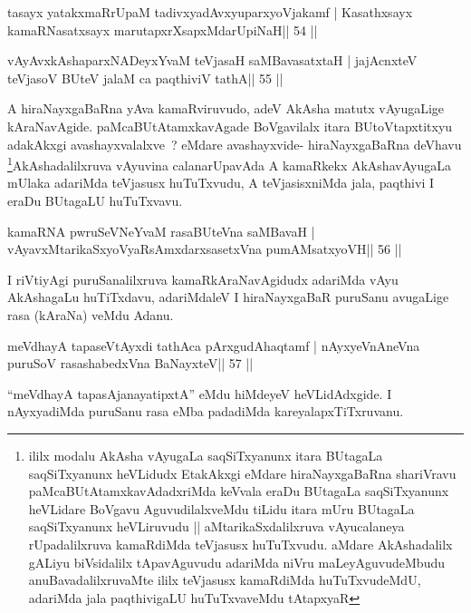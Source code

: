 \begin{shl}
tasayx yatakxmaRrUpaM tadivxyadAvxyuparxyoVjakamf |
Kasathxsayx kamaRNasatxsayx marutapxrXsapxMdarUpiNaH\hfill || 54 ||
\end{shl}

\begin{shl}
vAyAvxkAshaparxNADeyxYvaM teVjasaH saMBavasatxtaH |
jajAcnxteV teVjasoV BUteV jalaM ca paqthiviV tathA\hfill || 55 ||
\end{shl}

\begin{artha}
A hiraNayxgaBaRna yAva kamaRviruvudo, adeV AkAsha matutx vAyugaLige
kAraNavAgide. paMcaBUtAtamxkavAgade BoVgavilalx itara BUtoVtapxtitxyu
adakAkxgi avashayxvalalxve~? eMdare avashayxvide- hiraNayxgaBaRna
deVhavu \footnote{ililx modalu AkAsha vAyugaLa saqSiTxyanunx itara
BUtagaLa saqSiTxyanunx heVLidudx EtakAkxgi eMdare hiraNayxgaBaRna
shariVravu paMcaBUtAtamxkavAdadxriMda keVvala eraDu BUtagaLa
saqSiTxyanunx heVLidare BoVgavu AguvudilalxveMdu tiLidu itara mUru
BUtagaLa saqSiTxyanunx heVLiruvudu || aMtarikaSxdalilxruva
vAyucalaneya rUpadalilxruva kamaRdiMda teVjasusx huTuTxvudu. aMdare
AkAshadalilx gALiyu biVsidalilx tApavAguvudu adariMda niVru
maLeyAguvudeMbudu anuBavadalilxruvaMte ililx teVjasusx kamaRdiMda
huTuTxvudeMdU, adariMda jala paqthivigaLU huTuTxvaveMdu tAtapxyaR}AkAshadalilxruva vAyuvina calanarUpavAda A
kamaRkekx AkAshavAyugaLa mUlaka adariMda teVjasusx huTuTxvudu, A
teVjasisxniMda jala, paqthivi I eraDu BUtagaLU huTuTxvavu.
\end{artha}

\begin{shl}
kamaRNA pwruSeVNeYvaM rasaBUteVna saMBavaH |
vAyavxMtarikaSxyoVyaRsAmxdarxsasetxVna pumAMsatxyoVH\hfill || 56 ||
\end{shl}

\begin{artha}
I riVtiyAgi puruSanalilxruva kamaRkAraNavAgidudx adariMda vAyu AkAshagaLu huTiTxdavu, adariMdaleV I hiraNayxgaBaR puruSanu avugaLige rasa (kAraNa) veMdu Adanu.
\end{artha}

\begin{shl}
meVdhayA tapaseVtAyxdi tathAca pArxgudAhaqtamf |
nAyxyeVnAneVna puruSoV rasashabedxVna BaNayxteV\hfill || 57 ||
\end{shl}

\begin{artha}
``meVdhayA tapasA\s janayatipxtA'' eMdu hiMdeyeV heVLidAdxgide. I nAyxyadiMda puruSanu rasa eMba padadiMda kareyalapxTiTxruvanu.
\end{artha}

